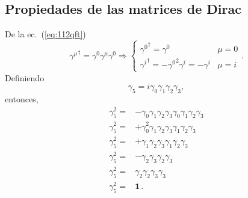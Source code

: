 \subsection{Propiedades de las matrices de Dirac}
\label{sec:propiedades-de-las}
De la ec.~(\ref{eq:112qft})
\begin{equation}
  {\gamma^\mu}^\dagger=\gamma^0\gamma^\mu\gamma^0\Rightarrow  
  \begin{cases}
    {\gamma^0}^\dagger=\gamma^0&\mu=0\\
    {\gamma^i}^\dagger=-{\gamma^0}^2\gamma^i=-\gamma^i&\mu=i
  \end{cases}.
\end{equation}
Definiendo
\begin{equation}
\label{eq:117qft}
  \gamma_5=i\gamma_0\gamma_1\gamma_2\gamma_3,
\end{equation}
entonces,
\begin{align}
  \gamma_5^2=&-\gamma_0\gamma_1\gamma_2\gamma_3\gamma_0\gamma_1\gamma_2\gamma_3\nonumber\\
  \gamma_5^2=&+\gamma_0^2\gamma_1\gamma_2\gamma_3\gamma_1\gamma_2\gamma_3\nonumber\\
  \gamma_5^2=&+\gamma_1\gamma_2\gamma_3\gamma_1\gamma_2\gamma_3\nonumber\\
  \gamma_5^2=&-\gamma_2\gamma_3\gamma_2\gamma_3\nonumber\\
  \gamma_5^2=&\gamma_2\gamma_2\gamma_3\gamma_3\nonumber\\
  \gamma_5^2=&\mathbf{1}\,.
\end{align}


